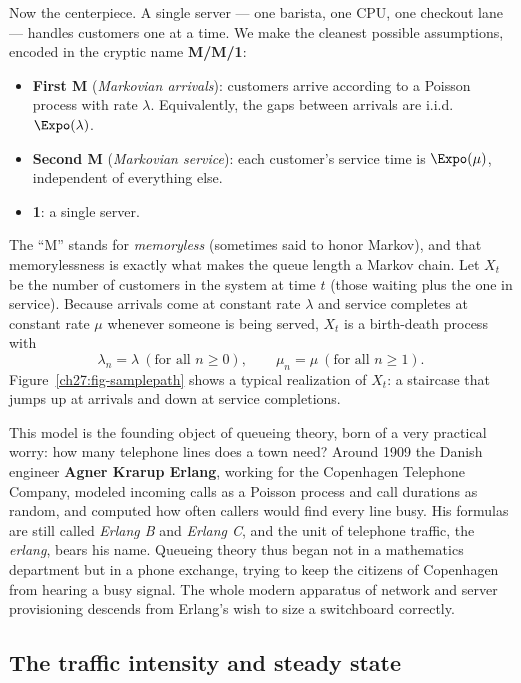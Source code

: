 Now the centerpiece. A single server --- one barista, one CPU, one checkout lane --- handles
customers one at a time. We make the cleanest possible assumptions, encoded in the cryptic name
\textbf{M/M/1}:

\begin{itemize}
  \item \textbf{First M} (\emph{Markovian arrivals}): customers arrive according to a Poisson process
  with rate $\lambda$. Equivalently, the gaps between arrivals are i.i.d.\ $\Expo(\lambda)$.
  \item \textbf{Second M} (\emph{Markovian service}): each customer's service time is $\Expo(\mu)$,
  independent of everything else.
  \item \textbf{1}: a single server.
\end{itemize}

The ``M'' stands for \emph{memoryless} (sometimes said to honor Markov), and that memorylessness is
exactly what makes the queue length a Markov chain. Let $X_t$ be the number of customers in the
system at time $t$ (those waiting plus the one in service). Because arrivals come at constant rate
$\lambda$ and service completes at constant rate $\mu$ whenever someone is being served, $X_t$ is a
birth-death process with
\[
  \lambda_n = \lambda \ (\text{for all } n \ge 0),
  \qquad \mu_n = \mu \ (\text{for all } n \ge 1).
\]
Figure~\ref{ch27:fig-samplepath} shows a typical realization of $X_t$: a staircase that jumps up at
arrivals and down at service completions.

\begin{historybox}
This model is the founding object of queueing theory, born of a very practical worry: how many
telephone lines does a town need? Around 1909 the Danish engineer \textbf{Agner Krarup Erlang},
working for the Copenhagen Telephone Company, modeled incoming calls as a Poisson process and
call durations as random, and computed how often callers would find every line busy. His formulas
are still called \emph{Erlang B} and \emph{Erlang C}, and the unit of telephone traffic, the
\emph{erlang}, bears his name. Queueing theory thus began not in a mathematics department but in a
phone exchange, trying to keep the citizens of Copenhagen from hearing a busy signal. The whole
modern apparatus of network and server provisioning descends from Erlang's wish to size a switchboard
correctly.
\end{historybox}

\subsection{The traffic intensity and steady state}

